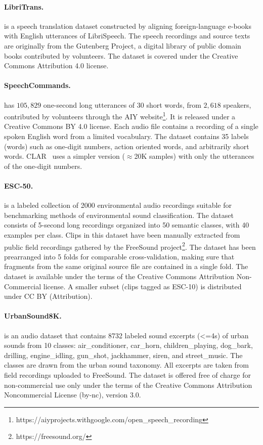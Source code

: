 \documentclass{article}
\begin{document}
\paragraph{LibriTrans.} \citep{libritrans} is a speech translation dataset constructed by aligning foreign-language e-books with English utterances of LibriSpeech. The speech recordings and source texts are originally from the Gutenberg Project, a digital library of public domain books contributed by volunteers. The dataset is covered under the Creative Commons Attribution 4.0 license.
\paragraph{SpeechCommands.} \citep{warden2018speech} has $105,829$ one-second long utterances of $30$ short words, from $2,618$ speakers, contributed by volunteers through the AIY website\footnote{https://aiyprojects.withgoogle.com/open\_speech\_recording}. It is released under a Creative Commons BY 4.0 license. Each audio file contains a recording of a single spoken English word from a limited vocabulary. The dataset contains 35 labels (words) such as one-digit numbers, action oriented words, and arbitrarily short words. CLAR~\citep{clar} uses a simpler version ($\approx$20K samples) with only the utterances of the one-digit numbers.
\paragraph{ESC-50.} \citep{piczak2015dataset} is a labeled collection of 2000 environmental audio recordings suitable for benchmarking methods of environmental sound classification. The dataset consists of 5-second long recordings organized into 50 semantic classes, with 40 examples per class. Clips in this dataset have been manually extracted from public field recordings gathered by the FreeSound project\footnote{https://freesound.org/}. The dataset has been prearranged into 5 folds for comparable cross-validation, making sure that fragments from the same original source file are contained in a single fold. The dataset is available under the terms of the Creative Commons Attribution Non-Commercial license. A smaller subset (clips tagged as ESC-10) is distributed under CC BY (Attribution).
\paragraph{UrbanSound8K.} \citep{Salamon:UrbanSound:ACMMM:14} is an audio dataset that contains 8732 labeled sound excerpts (<=4s) of urban sounds from 10 classes: air\_conditioner, car\_horn, children\_playing, dog\_bark, drilling, engine\_idling, gun\_shot, jackhammer, siren, and street\_music. The classes are drawn from the urban sound taxonomy. All excerpts are taken from field recordings uploaded to FreeSound. The dataset is offered free of charge for non-commercial use only under the terms of the Creative Commons Attribution Noncommercial License (by-nc), version 3.0.
\end{document}
